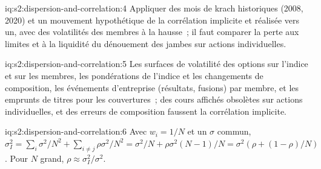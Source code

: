 \begin{solution}{iq:s2:dispersion-and-correlation:4}
Appliquer des mois de krach historiques (2008, 2020) et un mouvement hypothétique de la corrélation implicite et réalisée vers un, avec des volatilités des membres à la hausse~; il faut
comparer la perte aux limites et à la liquidité du dénouement des jambes sur actions individuelles.
\end{solution}

\begin{solution}{iq:s2:dispersion-and-correlation:5}
Les surfaces de volatilité des options sur l'indice et sur les membres, les pondérations de l'indice et les changements de composition, les événements d'entreprise (résultats, fusions) par membre, et les emprunts de titres pour les couvertures~; des cours
affichés obsolètes sur actions individuelles, et des erreurs de composition faussent la corrélation implicite.
\end{solution}

\begin{solution}{iq:s2:dispersion-and-correlation:6}
Avec $w_i = 1/N$ et un $\sigma$ commun, $\sigma_I^2 = \sum_i\sigma^2/N^2 + \sum_{i \ne j}\rho\sigma^2/N^2 = \sigma^2/N + \rho\sigma^2(N - 1)/N = \sigma^2(\rho +
(1 - \rho)/N)$. Pour $N$ grand, $\rho \approx \sigma_I^2/\sigma^2$.
\end{solution}
